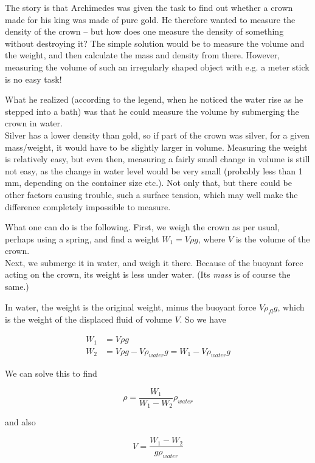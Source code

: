 The story is that Archimedes was given the task to find out whether a crown made for his king was made of pure gold. He therefore wanted to measure the density of the crown -- but how does one measure the density of something without destroying it? The simple solution would be to measure the volume and the weight, and then calculate the mass and density from there. However, measuring the volume of such an irregularly shaped object with e.g. a meter stick is no easy task!

What he realized (according to the legend, when he noticed the water rise as he stepped into a bath) was that he could measure the volume by submerging the crown in water.\\
Silver has a lower density than gold, so if part of the crown was silver, for a given mass/weight, it would have to be slightly larger in volume. Measuring the weight is relatively easy, but even then, measuring a fairly small change in volume is still not easy, as the change in water level would be very small (probably less than 1 mm, depending on the container size etc.). Not only that, but there could be other factors causing trouble, such a surface tension, which may well make the difference completely impossible to measure.

What one can do is the following. First, we weigh the crown as per usual, perhaps using a spring, and find a weight $W_1 = V \rho g$, where $V$ is the volume of the crown.\\
Next, we submerge it in water, and weigh it there. Because of the buoyant force acting on the crown, its weight is less under water. (Its \emph{mass} is of course the same.)

In water, the weight is the original weight, minus the buoyant force $V \rho_{fl} g$, which is the weight of the displaced fluid of volume $V$. So we have

\begin{align}
W_1 &= V \rho g\\
W_2 &= V \rho g - V \rho_{water} g = W_1 - V \rho_{water} g
\end{align}

We can solve this to find

\begin{equation}
\rho = \frac{W_1}{W_1 - W_2} \rho_{water}
\end{equation}

and also

\begin{equation}
V = \frac{W_1 - W_2}{g \rho_{water}}
\end{equation}

